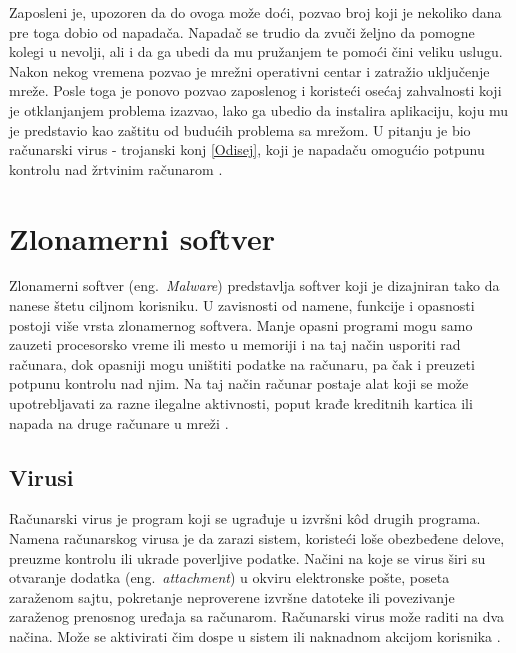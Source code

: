\documentclass[a4paper]{article}
\begin{document}
Zaposleni je, upozoren da do ovoga može doći, pozvao broj koji je nekoliko dana pre toga dobio od napadača. Napadač se trudio da zvuči željno da pomogne kolegi u nevolji, ali i da ga ubedi da mu pružanjem te pomoći čini veliku uslugu. Nakon nekog vremena pozvao je mrežni operativni centar i zatražio uključenje mreže. Posle toga je ponovo pozvao zaposlenog i koristeći osećaj zahvalnosti koji je otklanjanjem problema izazvao, lako ga ubedio da instalira aplikaciju, koju mu je predstavio kao zaštitu od budućih problema sa mrežom. U pitanju je bio računarski virus - trojanski konj \ref{Odisej}, koji je napadaču omogućio potpunu kontrolu nad žrtvinim računarom \cite{deception}.

\section{Zlonamerni softver}

Zlonamerni softver (eng.~{\em Malware}) predstavlja softver koji je dizajniran tako da nanese štetu ciljnom korisniku. U zavisnosti od namene, funkcije i opasnosti postoji više vrsta zlonamernog softvera. Manje opasni programi mogu samo zauzeti procesorsko vreme ili mesto u memoriji i na taj način usporiti rad računara, dok opasniji mogu uništiti podatke na računaru, pa čak i preuzeti potpunu kontrolu nad njim. Na taj način računar postaje alat koji se može upotrebljavati za razne ilegalne aktivnosti, poput krađe kreditnih kartica ili napada na druge računare u mreži \cite{ethics}.


\subsection{Virusi}
\label{sec:malware}

Računarski virus je program koji se ugrađuje u izvršni kôd drugih programa. Namena računarskog virusa je da zarazi sistem, koristeći loše obezbeđene delove, preuzme kontrolu ili ukrade poverljive podatke. Načini na koje se virus širi su otvaranje dodatka (eng.~{\em attachment}) u okviru elektronske pošte, poseta zaraženom sajtu, pokretanje neproverene izvršne datoteke ili povezivanje zaraženog prenosnog uređaja sa računarom. Računarski virus može raditi na dva načina. Može se aktivirati čim dospe u sistem ili naknadnom akcijom korisnika \cite{viruses_and_worms,computer_virus}.
\end{document}
